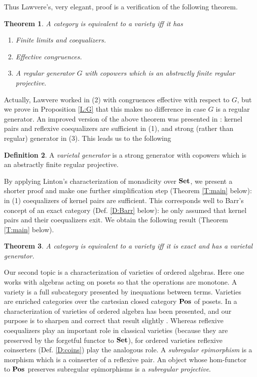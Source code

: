 \documentclass[12pt,amstex,leqno]{amsart}
\newcommand\Set{\operatorname{\bf Set}}
\newcommand\Pos{\operatorname{\bf Pos}}
\newtheorem{theorem}{Theorem}[section]
\theoremstyle{definition}
\newtheorem{defi}[theorem]{Definition}
\numberwithin{equation}{section}
\begin{document}
	Thus Lawvere's, very elegant, proof is a verification of  the following theorem.
	
	\begin{theorem}\label{th1.1}
		A category is equivalent to a variety iff it has 
		\begin{enumerate}
			\item[(1)] Finite limits and coequalizers.
			
			\item[(2)] Effective congruences.
			
			\item[(3)] A regular generator $G$  with copowers which is  an abstractly finite regular projective.
		\end{enumerate}
	\end{theorem}
	Actually, Lawvere worked in (2) with congruences effective with respect to $G$, but we prove in Proposition \ref{L:G} that this makes no difference in case $G$ is a regular generator. 
	An improved version of the above theorem was presented  in \cite{ARV}: kernel pairs and reflexive  coequalizers are sufficient in (1), and strong (rather than regular) generator in (3). This leads us to the following
	
	\begin{defi}\label{D:vg}
		A \emph{varietal generator} is a strong generator with copowers which is an abstractly finite regular projective.
	\end{defi} 
	
	By applying Linton's characterization of monadicity over $\Set$, we
	present a shorter proof and 
	make one further simplification step (Theorem \ref{T:main} below): in (1) coequalizers of kernel pairs are sufficient. This corresponds well to Barr's concept of an exact category (Def. \ref{D:Barr} below):
	he only assumed that kernel pairs and their coequalizers exit. We obtain the following result (Theorem \ref{T:main} below).
	
	
	\begin{theorem}\label{th1.3}
		A category is equivalent to a variety iff it is exact and has a varietal generator.
	\end{theorem}
	
	Our second topic is a characterization of varieties of ordered algebras. Here one works with algebras acting on posets so that the operations are monotone. A variety is a  full subcategory  presented by inequations between terms. Varieties are enriched categories over the cartesian closed category $\Pos$ of posets. In \cite{ARO} a characterization of varieties of ordered algebra has been presented, and our purpose is to sharpen and correct that result slightly . Whereas reflexive coequalizers play an important role in classical varieties (because they are preserved by the forgetful functor to $\Set$), for ordered varieties reflexive coinserters  (Def. \ref{D:coins}) play the analogous role.
	A \emph{subregular epimorphism} is a morphism which is a coinserter of a reflexive pair. An object whose hom-functor to $\Pos$ preserves subregular epimorphisms is a \emph{subregular projective}.
	
\end{document}
